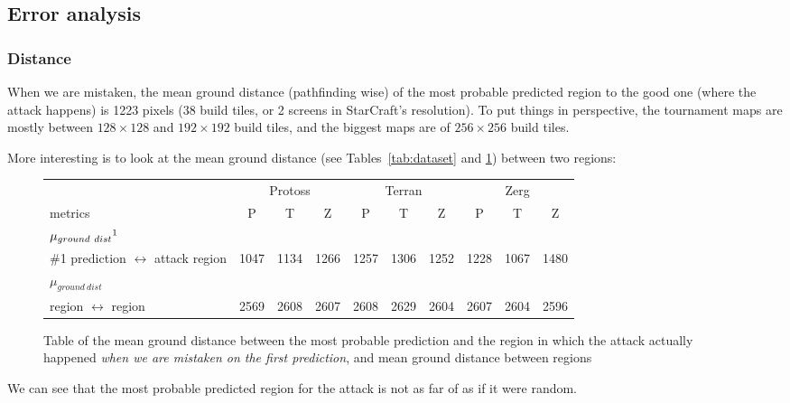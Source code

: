 \subsection{Error analysis}

\subsubsection{Distance}

When we are mistaken, the mean ground distance (pathfinding wise) of the most probable predicted region to the good one (where the attack happens) is 1223 pixels (38 build tiles, or 2 screens in StarCraft's resolution). 
To put things in perspective, %
the tournament maps are mostly between $128\times128$ and $192\times192$ build tiles, and the biggest maps are of $256\times 256$ build tiles.

More interesting is to look at the mean ground distance (see Tables~\ref{tab:dataset} and \ref{tab:shorttacticaldistances}) between two regions: 
\begin{figure}[h]
\begin{tabular}{|l|ccc|ccc|ccc|}
\hline
 & \multicolumn{3}{|c|}{Protoss} & \multicolumn{3}{|c|}{Terran} & \multicolumn{3}{|c|}{Zerg} \\
metrics & P & T & Z & P & T & Z & P & T & Z \\
\hline
$\mu_{ground\ dist}\footnote{for regions connected by ground, pathfinding aware, in pixels}$ & & & & & & & & & \\
\#1 prediction $\leftrightarrow$ attack region & 1047 & 1134 & 1266 & 1257 & 1306 & 1252 & 1228 & 1067 & 1480 \\
\hline
$\mu_{ground\ dist}$ & & & & & & & & &\\
 region $\leftrightarrow$ region & 2569 & 2608 & 2607 & 2608 & 2629 & 2604 & 2607 & 2604 & 2596 \\ %
\hline
\end{tabular}
\caption{Table of the mean ground distance between the most probable prediction and the region in which the attack actually happened \textit{when we are mistaken on the first prediction}, and mean ground distance between regions}
\label{tab:shorttacticaldistances}
\end{figure}
We can see that the most probable predicted region for the attack is not as far of as if it were random.

